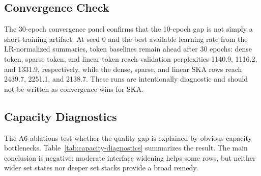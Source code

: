 \documentclass{article}
\theoremstyle{plain}
\theoremstyle{definition}
\theoremstyle{remark}
\begin{document}
\subsection{Convergence Check}
\label{sec:results-convergence}

The 30-epoch convergence panel confirms that the 10-epoch gap is not simply a
short-training artifact.  At seed 0 and the best available learning rate from
the LR-normalized summaries, token baselines remain ahead after 30 epochs:
dense token, sparse token, and linear token reach validation perplexities
1140.9, 1116.2, and 1331.9, respectively, while the dense, sparse, and linear
SKA rows reach 2439.7, 2251.1, and 2138.7.  These runs are intentionally
diagnostic and should not be written as convergence wins for SKA.

\subsection{Capacity Diagnostics}
\label{sec:results-capacity}

The A6 ablations test whether the quality gap is explained by obvious capacity
bottlenecks.  Table~\ref{tab:capacity-diagnostics} summarizes the result.  The
main conclusion is negative: moderate interface widening helps some rows, but
neither wider set states nor deeper set stacks provide a broad remedy.
\end{document}

